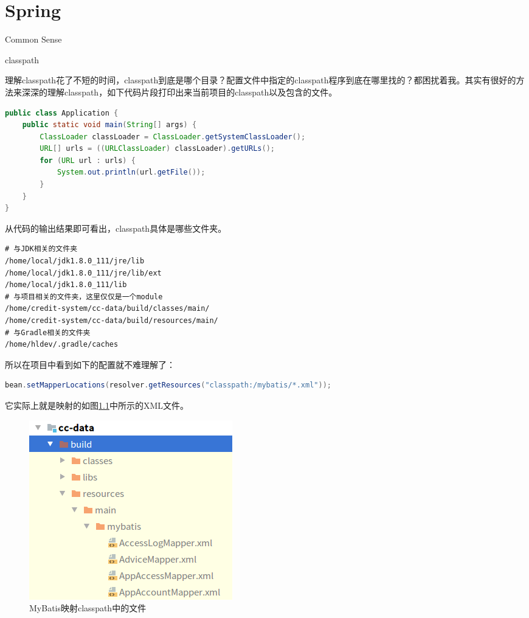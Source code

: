 \documentclass[11pt,fleqn]{book}
\makeatletter
\numberwithin{dummy}{section}
\theoremstyle{ocrenumbox}
\theoremstyle{blacknumex}
\theoremstyle{blacknumbox}
\theoremstyle{ocrenum}
\renewcommand{\section}{\@startsection{section}{1}{\z@}
	{-4ex \@plus -1ex \@minus -.4ex}
	{1ex \@plus.2ex }
	{\normalfont\large\sffamily\bfseries}}
\renewcommand{\subsection}{\@startsection {subsection}{2}{\z@}
	{-3ex \@plus -0.1ex \@minus -.4ex}
	{0.5ex \@plus.2ex }
	{\normalfont\sffamily\bfseries}}
\makeatother
\begin{document}
\chapter{Spring}

\section{Common Sense}

\subsection{classpath}

理解classpath花了不短的时间，classpath到底是哪个目录？配置文件中指定的classpath程序到底在哪里找的？都困扰着我。其实有很好的方法来深深的理解classpath，如下代码片段打印出来当前项目的classpath以及包含的文件。

\begin{lstlisting}[language=Java]
public class Application {
	public static void main(String[] args) {
		ClassLoader classLoader = ClassLoader.getSystemClassLoader();
		URL[] urls = ((URLClassLoader) classLoader).getURLs();
		for (URL url : urls) {
			System.out.println(url.getFile());
		}
	}
}
\end{lstlisting}

从代码的输出结果即可看出，classpath具体是哪些文件夹。

\begin{lstlisting}
# 与JDK相关的文件夹
/home/local/jdk1.8.0_111/jre/lib
/home/local/jdk1.8.0_111/jre/lib/ext
/home/local/jdk1.8.0_111/lib
# 与项目相关的文件夹，这里仅仅是一个module
/home/credit-system/cc-data/build/classes/main/
/home/credit-system/cc-data/build/resources/main/
# 与Gradle相关的文件夹
/home/hldev/.gradle/caches
\end{lstlisting}

所以在项目中看到如下的配置就不难理解了：

\begin{lstlisting}[language=Java]
bean.setMapperLocations(resolver.getResources("classpath:/mybatis/*.xml"));
\end{lstlisting}
它实际上就是映射的如图\ref{fig:classpathfile}中所示的XML文件。

\begin{figure}[tbph]
	\centering
	\includegraphics[scale=0.7]{classpathfile}
	\caption{MyBatis映射classpath中的文件}
	\label{fig:classpathfile}
\end{figure}
\end{document}
